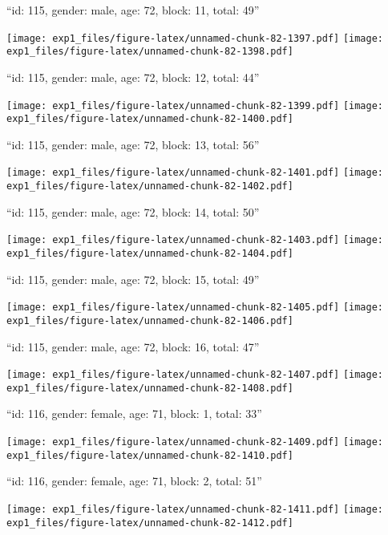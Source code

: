 \documentclass[11pt,,]{article}
\begin{document}
\newpage
[1] 

``id: 115, gender: male, age: 72, block: 11, total: 49''

\texttt{[image: exp1\_files/figure-latex/unnamed-chunk-82-1397.pdf]}
\texttt{[image: exp1\_files/figure-latex/unnamed-chunk-82-1398.pdf]}

\newpage
[1] 

``id: 115, gender: male, age: 72, block: 12, total: 44''

\texttt{[image: exp1\_files/figure-latex/unnamed-chunk-82-1399.pdf]}
\texttt{[image: exp1\_files/figure-latex/unnamed-chunk-82-1400.pdf]}

\newpage
[1] 

``id: 115, gender: male, age: 72, block: 13, total: 56''

\texttt{[image: exp1\_files/figure-latex/unnamed-chunk-82-1401.pdf]}
\texttt{[image: exp1\_files/figure-latex/unnamed-chunk-82-1402.pdf]}

\newpage
[1] 

``id: 115, gender: male, age: 72, block: 14, total: 50''

\texttt{[image: exp1\_files/figure-latex/unnamed-chunk-82-1403.pdf]}
\texttt{[image: exp1\_files/figure-latex/unnamed-chunk-82-1404.pdf]}

\newpage
[1] 

``id: 115, gender: male, age: 72, block: 15, total: 49''

\texttt{[image: exp1\_files/figure-latex/unnamed-chunk-82-1405.pdf]}
\texttt{[image: exp1\_files/figure-latex/unnamed-chunk-82-1406.pdf]}

\newpage
[1] 

``id: 115, gender: male, age: 72, block: 16, total: 47''

\texttt{[image: exp1\_files/figure-latex/unnamed-chunk-82-1407.pdf]}
\texttt{[image: exp1\_files/figure-latex/unnamed-chunk-82-1408.pdf]}

\newpage
[1] 

``id: 116, gender: female, age: 71, block: 1, total: 33''

\texttt{[image: exp1\_files/figure-latex/unnamed-chunk-82-1409.pdf]}
\texttt{[image: exp1\_files/figure-latex/unnamed-chunk-82-1410.pdf]}

\newpage
[1] 

``id: 116, gender: female, age: 71, block: 2, total: 51''

\texttt{[image: exp1\_files/figure-latex/unnamed-chunk-82-1411.pdf]}
\texttt{[image: exp1\_files/figure-latex/unnamed-chunk-82-1412.pdf]}
\end{document}
